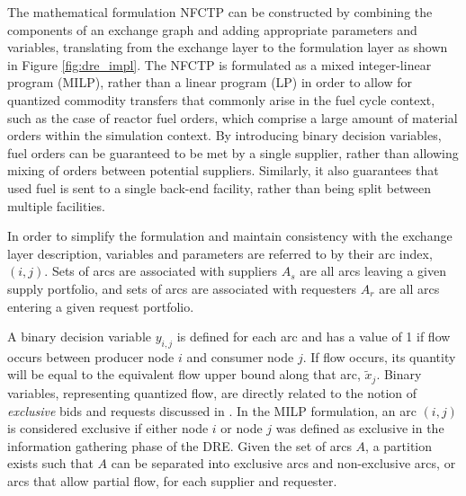The mathematical formulation NFCTP can be constructed by combining the
components of an exchange graph and adding appropriate parameters and variables,
translating from the exchange layer to the formulation layer as shown in Figure
\ref{fig:dre_impl}. The NFCTP is formulated as a mixed integer-linear program
(MILP), rather than a linear program (LP) in order to allow for quantized
commodity transfers that commonly arise in the fuel cycle context, such as the
case of reactor fuel orders, which comprise a large amount of material orders
within the simulation context. By introducing binary decision variables, fuel
orders can be guaranteed to be met by a single supplier, rather than allowing
mixing of orders between potential suppliers. Similarly, it also guarantees that
used fuel is sent to a single back-end facility, rather than being split between
multiple facilities.


In order to simplify the formulation and maintain consistency with the exchange
layer description, variables and parameters are referred to by their arc index,
$(i, j)$. Sets of arcs are associated with suppliers $A_s$ are all arcs leaving
a given supply portfolio, and sets of arcs are associated with requesters $A_r$
are all arcs entering a given request portfolio.


A binary decision variable $y_{i,j}$ is defined for each arc and has a value of
1 if flow occurs between producer node $i$ and consumer node $j$. If flow
occurs, its quantity will be equal to the equivalent flow upper bound along that
arc, $\tilde{x}_{j}$. Binary variables, representing quantized flow, are
directly related to the notion of \textit{exclusive} bids and requests discussed
in . In the MILP formulation, an arc $(i, j)$ is considered
exclusive if either node $i$ or node $j$ was defined as exclusive in the
information gathering phase of the DRE. Given the set of arcs $A$, a partition
exists such that $A$ can be separated into exclusive arcs and non-exclusive
arcs, or arcs that allow partial flow, for each supplier and requester.

